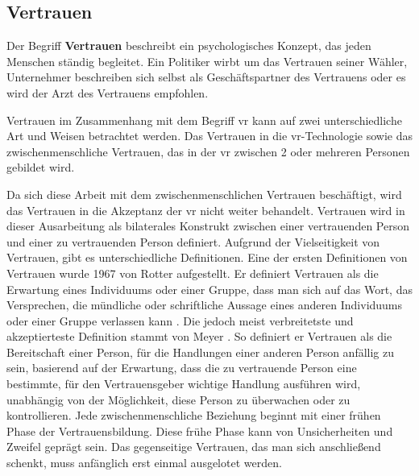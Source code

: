 \documentclass[a4paper,11pt]{article}%
\renewcommand{\\}{\vspace*{0.5\baselineskip} \newline}
\begin{document}
\newpage

	\subsection{Vertrauen}
	\label{Vertrauen}
Der Begriff \textbf{Vertrauen} beschreibt ein psychologisches Konzept, das jeden Menschen ständig begleitet.
Ein Politiker wirbt um das Vertrauen seiner Wähler, Unternehmer beschreiben sich selbst als Geschäftspartner des Vertrauens oder es wird der \dq{}Arzt des Vertrauens\dq{} empfohlen.

Vertrauen im Zusammenhang mit dem Begriff \dq{}\ac{vr}\dq{} kann auf zwei unterschiedliche Art und Weisen betrachtet werden. Das Vertrauen in die \ac{vr}-Technologie sowie das zwischenmenschliche Vertrauen, das in der \ac{vr} zwischen 2 oder mehreren Personen gebildet wird.

Da sich diese Arbeit mit dem zwischenmenschlichen Vertrauen beschäftigt, wird das Vertrauen in die Akzeptanz der \ac{vr} nicht weiter behandelt.
Vertrauen wird in dieser Ausarbeitung als bilaterales Konstrukt zwischen einer vertrauenden Person und einer zu vertrauenden Person definiert.
Aufgrund der Vielseitigkeit von Vertrauen, gibt es unterschiedliche Definitionen. \newline
Eine der ersten Definitionen von Vertrauen wurde 1967 von Rotter aufgestellt. Er definiert Vertrauen als 
\\
\dq{}die Erwartung eines Individuums oder einer Gruppe, dass man sich auf das Wort, das Versprechen, die mündliche oder schriftliche Aussage eines anderen Individuums oder einer Gruppe verlassen kann\dq{} \citep[p.651]{rotter1967new}.
\\
Die jedoch meist verbreitetste und akzeptierteste Definition stammt von Meyer \citep[p.712]{mayer1995integrative}. So definiert er Vertrauen als 
\\ 
\dq{}die Bereitschaft einer Person, für die Handlungen einer anderen Person anfällig zu sein, basierend auf der Erwartung, dass die zu vertrauende Person eine bestimmte, für den Vertrauensgeber wichtige Handlung ausführen wird, unabhängig von der Möglichkeit, diese Person zu überwachen oder zu kontrollieren.\dq{}
\\
Jede zwischenmenschliche Beziehung beginnt mit einer frühen Phase der Vertrauensbildung. Diese frühe Phase kann von Unsicherheiten und Zweifel geprägt sein. Das gegenseitige Vertrauen, das man sich anschließend schenkt, muss anfänglich erst einmal ausgelotet werden. 
\end{document}
